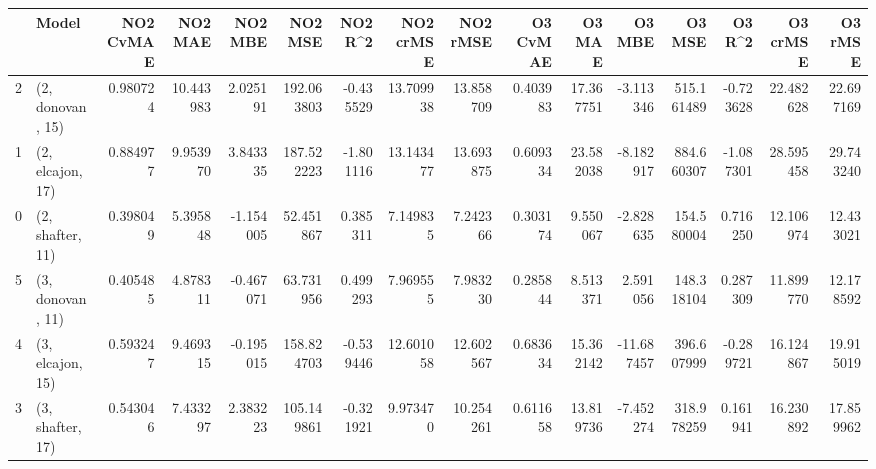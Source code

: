 \begin{tabular}{llrrrrrrrrrrrrrr}
\toprule
{} &             Model &  NO2 CvMAE &    NO2 MAE &   NO2 MBE &     NO2 MSE &   NO2 R\textasciicircum2 &  NO2 crMSE &   NO2 rMSE &  O3 CvMAE &     O3 MAE &     O3 MBE &      O3 MSE &    O3 R\textasciicircum2 &   O3 crMSE &    O3 rMSE \\
\midrule
2 &  (2, donovan, 15) &   0.980724 &  10.443983 &  2.025191 &  192.063803 & -0.435529 &  13.709938 &  13.858709 &  0.403983 &  17.367751 &  -3.113346 &  515.161489 & -0.723628 &  22.482628 &  22.697169 \\
1 &  (2, elcajon, 17) &   0.884977 &   9.953970 &  3.843335 &  187.522223 & -1.801116 &  13.143477 &  13.693875 &  0.609334 &  23.582038 &  -8.182917 &  884.660307 & -1.087301 &  28.595458 &  29.743240 \\
0 &  (2, shafter, 11) &   0.398049 &   5.395848 & -1.154005 &   52.451867 &  0.385311 &   7.149835 &   7.242366 &  0.303174 &   9.550067 &  -2.828635 &  154.580004 &  0.716250 &  12.106974 &  12.433021 \\
5 &  (3, donovan, 11) &   0.405485 &   4.878311 & -0.467071 &   63.731956 &  0.499293 &   7.969555 &   7.983230 &  0.285844 &   8.513371 &   2.591056 &  148.318104 &  0.287309 &  11.899770 &  12.178592 \\
4 &  (3, elcajon, 15) &   0.593247 &   9.469315 & -0.195015 &  158.824703 & -0.539446 &  12.601058 &  12.602567 &  0.683634 &  15.362142 & -11.687457 &  396.607999 & -0.289721 &  16.124867 &  19.915019 \\
3 &  (3, shafter, 17) &   0.543046 &   7.433297 &  2.383223 &  105.149861 & -0.321921 &   9.973470 &  10.254261 &  0.611658 &  13.819736 &  -7.452274 &  318.978259 &  0.161941 &  16.230892 &  17.859962 \\
\bottomrule
\end{tabular}
